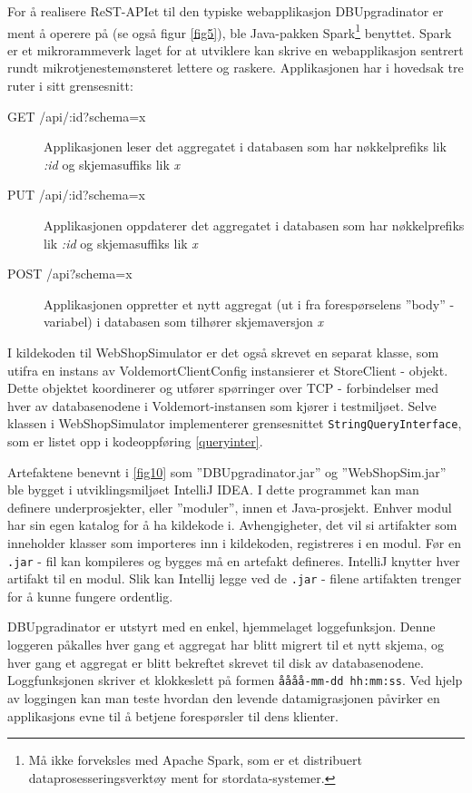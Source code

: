 For å realisere ReST-APIet til den typiske webapplikasjon DBUpgradinator er ment å operere på (se også figur \ref{fig5}), ble Java-pakken Spark\footnote{Må ikke forveksles med Apache Spark, som er et distribuert dataprosesseringsverktøy ment for stordata-systemer.} benyttet. Spark er et mikro\-rammeverk laget for at utviklere kan skrive en webapplikasjon sentrert rundt mikrotjeneste\-mønsteret lettere og raskere. Applikasjonen har i hovedsak tre ruter i sitt grensesnitt:

\begin{description}
  \item[GET /api/:id?schema=x] Applikasjonen leser det aggregatet i databasen som har nøkkelprefiks lik \emph{:id} og skjemasuffiks lik \emph{x}
  \item[PUT /api/:id?schema=x] Applikasjonen oppdaterer det aggregatet i databasen som har nøkkelprefiks lik \emph{:id} og skjemasuffiks lik \emph{x}
  \item[POST /api?schema=x] Applikasjonen oppretter et nytt aggregat (ut i fra forespørselens ''body'' - variabel) i databasen som tilhører skjemaversjon \emph{x}
\end{description}

I kildekoden til WebShopSimulator er det også skrevet en separat klasse, som utifra en instans av VoldemortClientConfig instansierer et StoreClient - objekt. Dette objektet koordinerer og utfører spørringer over TCP - forbindelser med hver av databasenodene i Voldemort-instansen som kjører i testmiljøet. Selve klassen i WebShopSimulator implementerer grensesnittet \texttt{StringQueryInterface}, som er listet opp i kodeoppføring \ref{queryinter}.

Artefaktene benevnt i \ref{fig10} som ''DBUpgradinator.jar'' og ''WebShopSim.jar'' ble bygget i utviklingsmiljøet IntelliJ IDEA. I dette programmet kan man definere underprosjekter, eller ''moduler'', innen et Java-prosjekt. Enhver modul har sin egen katalog for å ha kildekode i. Avhengigheter, det vil si artifakter som inneholder klasser som importeres inn i kildekoden, registreres i en modul. Før en \texttt{.jar} - fil kan kompileres og bygges må en artefakt defineres. IntelliJ knytter hver artifakt til en modul. Slik kan Intellij legge ved de \texttt{.jar} - filene artifakten trenger for å kunne fungere ordentlig.

DBUpgradinator er utstyrt med en enkel, hjemmelaget loggefunksjon. Denne loggeren påkalles hver gang et aggregat har blitt migrert til et nytt skjema, og hver gang et aggregat er blitt bekreftet skrevet til disk av databasenodene. Loggfunksjonen skriver et klokkeslett på formen \texttt{åååå-mm-dd hh:mm:ss}. Ved hjelp av loggingen kan man teste hvordan den levende datamigrasjonen påvirker en applikasjons evne til å betjene forespørsler til dens klienter.


